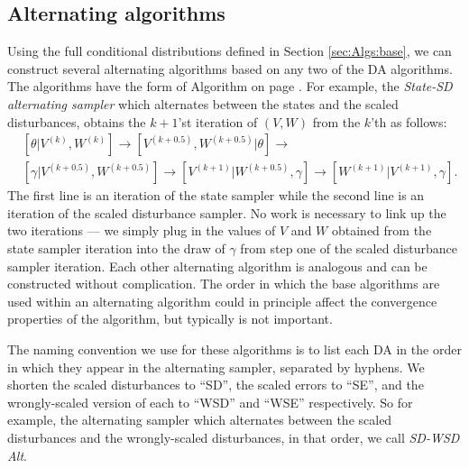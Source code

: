 \documentclass[12pt]{article}
\begin{document}
\subsection{Alternating algorithms}\label{sec:Algs:alt}
Using the full conditional distributions defined in Section \ref{sec:Algs:base}, we can construct several alternating algorithms based on any two of the DA algorithms. The algorithms have the form of Algorithm  on page \pageref{alg:Alt}. For example, the {\it State-SD alternating sampler} which alternates between the states and the scaled disturbances, obtains the $k+1$'st iteration of $(V,W)$ from the $k$'th as follows:
\begin{align*}
&[\theta|V^{(k)},W^{(k)}] \to [V^{(k+0.5)},W^{(k+0.5)}|\theta] \to\\
&[\gamma|V^{(k+0.5)},W^{(k+0.5)}] \to [V^{(k+1)}|W^{(k+0.5)},\gamma] \to [W^{(k+1)}|V^{(k+1)},\gamma].
\end{align*}
The first line is an iteration of the state sampler while the second line is an iteration of the scaled disturbance sampler. No work is necessary to link up the two iterations --- we simply plug in the values of $V$ and $W$ obtained from the state sampler iteration into the draw of $\gamma$ from step one of the scaled disturbance sampler iteration. Each other alternating algorithm is analogous and can be constructed without complication. The order in which the base algorithms are used within an alternating algorithm could in principle affect the convergence properties of the algorithm, but typically is not important. 

The naming convention we use for these algorithms is to list each DA in the order in which they appear in the alternating sampler, separated by hyphens. We shorten the scaled disturbances to ``SD'', the scaled errors to ``SE'', and the wrongly-scaled version of each to ``WSD'' and ``WSE'' respectively. So for example, the alternating sampler which alternates between the scaled disturbances and the wrongly-scaled disturbances, in that order, we call {\it SD-WSD Alt}. 
\end{document}
